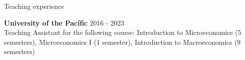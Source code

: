 \documentclass{resume} %
\begin{document}
\begin{rSection}{Teaching experience}

{\bf University of the Pacífic}  \hfill {2016 - 2023}\\
Teaching Assistant for the following course: Introduction to Microeconomics (5 semesters), Microeconomics I (1 semester), Introduction to Macroeconomics (9 semesters)
\end{rSection}

\end{document}
